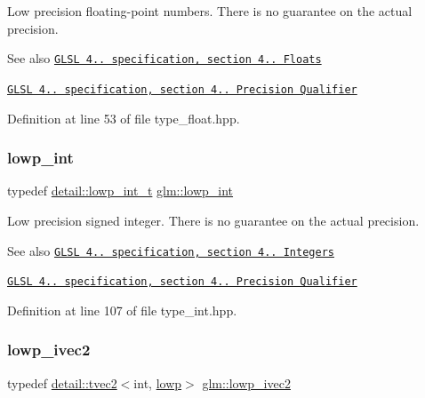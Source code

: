 Low precision floating-\/point numbers. There is no guarantee on the actual precision.

\begin{DoxySeeAlso}{See also}
\href{http://www.opengl.org/registry/doc/GLSLangSpec.4.20.8.pdf}{\tt G\+L\+SL 4.. specification, section 4.. Floats} 

\href{http://www.opengl.org/registry/doc/GLSLangSpec.4.20.8.pdf}{\tt G\+L\+SL 4.. specification, section 4.. Precision Qualifier} 
\end{DoxySeeAlso}


Definition at line 53 of file type\+\_\+float.\+hpp.

\mbox{\label{group__core__precision_ga4681244bf4a184734f03aa9df4e3d288}} 
\subsubsection{\texorpdfstring{lowp\+\_\+int}{lowp\_int}}
{\footnotesize\ttfamily typedef \hyperlink{namespaceglm_1_1detail_a030a8128e369fc1f9c7982dc68a78ba7}{detail\+::lowp\+\_\+int\+\_\+t} \hyperlink{group__core__precision_ga4681244bf4a184734f03aa9df4e3d288}{glm\+::lowp\+\_\+int}}

Low precision signed integer. There is no guarantee on the actual precision.

\begin{DoxySeeAlso}{See also}
\href{http://www.opengl.org/registry/doc/GLSLangSpec.4.20.8.pdf}{\tt G\+L\+SL 4.. specification, section 4.. Integers} 

\href{http://www.opengl.org/registry/doc/GLSLangSpec.4.20.8.pdf}{\tt G\+L\+SL 4.. specification, section 4.. Precision Qualifier} 
\end{DoxySeeAlso}


Definition at line 107 of file type\+\_\+int.\+hpp.

\mbox{\label{group__core__precision_ga562c5c67d6431ab88fc4a032239e2137}} 
\subsubsection{\texorpdfstring{lowp\+\_\+ivec2}{lowp\_ivec2}}
{\footnotesize\ttfamily typedef \hyperlink{structglm_1_1detail_1_1tvec2}{detail\+::tvec2}$<$int, \hyperlink{namespaceglm_a0f04f086094c747d227af4425893f545ae161af3fc695e696ce3bf69f7332bc2d}{lowp}$>$ \hyperlink{group__core__precision_ga562c5c67d6431ab88fc4a032239e2137}{glm\+::lowp\+\_\+ivec2}}

